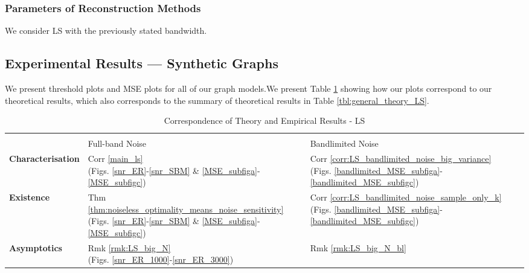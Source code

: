 \subsubsection{Parameters of Reconstruction Methods} We consider LS with the previously stated bandwidth.

\subsection{Experimental Results --- Synthetic Graphs}
\label{sec:LS:experiments_synthetic}
We present threshold plots and MSE plots for all of our graph models.We present Table \ref{tbl:theory_experiment_correspondence_LS} showing how our plots correspond to our theoretical results, which also corresponds to the summary of theoretical results in Table \ref{tbl:general_theory_LS}.


\begin{table}[h]
\caption{Correspondence of Theory and Empirical Results - LS}
\centering
\begin{tabularx}{\textwidth}{l >{\centering\arraybackslash}p{15em} >{\centering\arraybackslash}X}
\toprule
& \multicolumn{2}{c}{\textbf{LS}} \\
\cmidrule(lr){2-3}
 & Full-band Noise & Bandlimited Noise \\
\midrule
\textbf{Characterisation} & 
\makecell[c]{Corr \ref{main_ls} \\
(Figs. \ref{snr_ER}-\ref{snr_SBM} 
\& \ref{MSE_subfiga}-\ref{MSE_subfigc})} & 
\makecell[c]{Corr \ref{corr:LS_bandlimited_noise_big_variance} \\ (Figs. \ref{bandlimited_MSE_subfiga}- \ref{bandlimited_MSE_subfigc})} \\
\midrule
\textbf{Existence} & 
\makecell[c]{Thm \ref{thm:noiseless_optimality_means_noise_sensitivity} \\ (Figs. \ref{snr_ER}-\ref{snr_SBM}
\& \ref{MSE_subfiga}-\ref{MSE_subfigc})} & 
\makecell[c]{Corr \ref{corr:LS_bandlimited_noise_sample_only_k} \\ (Figs. \ref{bandlimited_MSE_subfiga}- \ref{bandlimited_MSE_subfigc})} \\
\midrule
\textbf{Asymptotics} & 
\makecell[c]{Rmk \ref{rmk:LS_big_N} \\ (Figs. \ref{snr_ER_1000}-\ref{snr_ER_3000})} & 
\makecell[c]{Rmk \ref{rmk:LS_big_N_bl}\\} \\
\bottomrule
\end{tabularx}
\label{tbl:theory_experiment_correspondence_LS}
\end{table}


